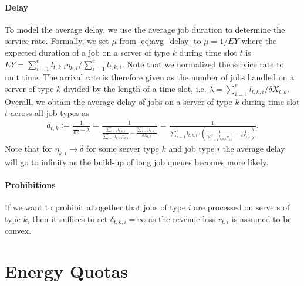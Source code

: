\paragraph{Delay} To model the average delay, we use the average job duration to determine the service rate. Formally, we set $\mu$ from \cref{eq:avg_delay} to $\mu = 1 / E Y$ where the expected duration of a job on a server of type $k$ during time slot $t$ is $E Y = \sum_{i=1}^e l_{t,k,i} \eta_{k,i} / \sum_{i=1}^e l_{t,k,i}$. Note that we normalized the service rate to unit time. The arrival rate is therefore given as the number of jobs handled on a server of type $k$ divided by the length of a time slot, i.e. $\lambda = \sum_{i=1}^e l_{t,k,i} / \delta X_{t,k}$. Overall, we obtain the average delay of jobs on a server of type $k$ during time slot $t$ across all job types as \begin{align*}
    d_{t,k} := \frac{1}{\frac{1}{E Y} - \lambda} = \frac{1}{\frac{\sum_{i=1}^e l_{t,k,i}}{\sum_{i=1}^e l_{t,k,i} \eta_{k,i}} - \frac{\sum_{i=1}^e l_{t,k,i}}{\delta X_{t,k}}} = \frac{1}{\sum_{i=1}^e l_{t,k,i} \cdot \left(\frac{1}{\sum_{i=1}^e l_{t,k,i} \eta_{k,i}} - \frac{1}{\delta X_{t,k}}\right)}.
\end{align*} Note that for $\eta_{k,i} \to \delta$ for some server type $k$ and job type $i$ the average delay will go to infinity as the build-up of long job queues becomes more likely.

\paragraph{Prohibitions} If we want to prohibit altogether that jobs of type $i$ are processed on servers of type $k$, then it suffices to set $\delta_{t,k,i} = \infty$ as the revenue loss $r_{t,i}$ is assumed to be convex.

\section{Energy Quotas}\label{section:application:energy_quotas}

